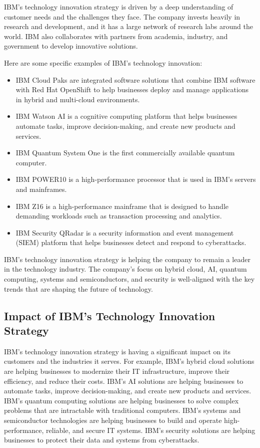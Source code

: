 IBM's technology innovation strategy is driven by a deep understanding of customer needs and the challenges they face. The company invests heavily in research and development, and it has a large network of research labs around the world. IBM also collaborates with partners from academia, industry, and government to develop innovative solutions.


Here are some specific examples of IBM's technology innovation:

\begin{itemize}
  \item IBM Cloud Paks are integrated software solutions that combine IBM software with Red Hat OpenShift to help businesses deploy and manage applications in hybrid and multi-cloud environments.
  \item IBM Watson AI is a cognitive computing platform that helps businesses automate tasks, improve decision-making, and create new products and services.
  \item IBM Quantum System One is the first commercially available quantum computer.
  \item IBM POWER10 is a high-performance processor that is used in IBM's servers and mainframes.
  \item IBM Z16 is a high-performance mainframe that is designed to handle demanding workloads such as transaction processing and analytics.
  \item IBM Security QRadar is a security information and event management (SIEM) platform that helps businesses detect and respond to cyberattacks.
\end{itemize}

IBM's technology innovation strategy is helping the company to remain a leader in the technology industry. The company's focus on hybrid cloud, AI, quantum computing, systems and semiconductors, and security is well-aligned with the key trends that are shaping the future of technology.

\subsection{Impact of IBM's Technology Innovation Strategy}

IBM's technology innovation strategy is having a significant impact on its customers and the industries it serves. For example, IBM's hybrid cloud solutions are helping businesses to modernize their IT infrastructure, improve their efficiency, and reduce their costs. IBM's AI solutions are helping businesses to automate tasks, improve decision-making, and create new products and services. IBM's quantum computing solutions are helping businesses to solve complex problems that are intractable with traditional computers. IBM's systems and semiconductor technologies are helping businesses to build and operate high-performance, reliable, and secure IT systems. IBM's security solutions are helping businesses to protect their data and systems from cyberattacks.

